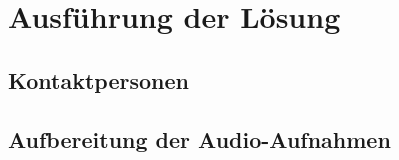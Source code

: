 \chapter{Ausführung der Lösung}\label{ch:solution}

\section{Kontaktpersonen}

\section{Aufbereitung der Audio-Aufnahmen}

